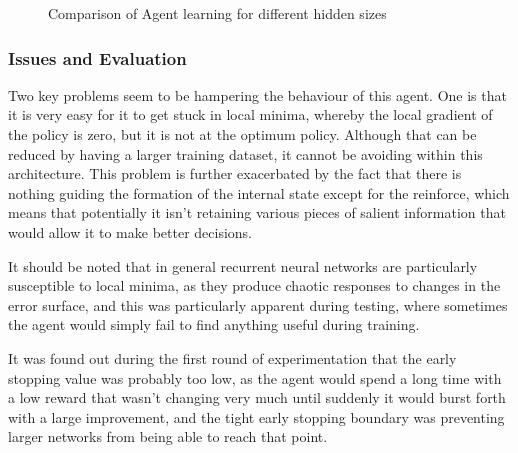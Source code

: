 %
%
%

\begin{figure}
\centering

\caption{Comparison of Agent learning for different hidden sizes}
\label{fig:exp1rfo}
\end{figure}

\subsubsection{Issues and Evaluation} %


Two key problems seem to be hampering the behaviour of this agent. One is that it is very easy for it to get stuck in local minima, whereby the local gradient of the policy is zero, but it is not at the optimum policy. Although that can be reduced by having a larger training dataset, it cannot be avoiding within this architecture. This problem is further exacerbated by the fact that there is nothing guiding the formation of the internal state except for the reinforce, which means that potentially it isn't retaining various pieces of salient information that would allow it to make better decisions.

It should be noted that in general recurrent neural networks are particularly susceptible to local minima, as they produce chaotic responses to changes in the error surface\cite{Cuéllar2006}, and this was particularly apparent during testing, where sometimes the agent would simply fail to find anything useful during training. %

It was found out during the first round of experimentation that the early stopping value was probably too low, as the agent would spend a long time with a low reward that wasn't changing very much until suddenly it would burst forth with a large improvement, and the tight early stopping boundary was preventing larger networks from being able to reach that point.

